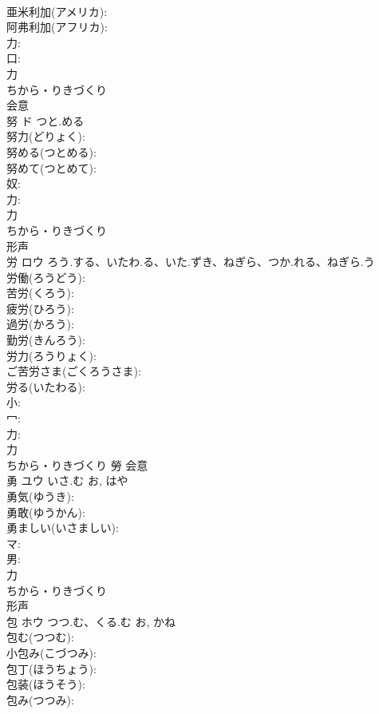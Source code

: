 \documentclass[8pt]{extreport}
\begin{document}
\begin{CJK}{UTF8}{min}
\\	亜米利加(アメリカ): 
\\	阿弗利加(アフリカ): 
\\	力: 
\\	口: 
\\	力	
\\	ちから・りきづくり	
\\	会意 
\\	努	ド	つと.める		
\\	努力(どりょく): 
\\	努める(つとめる): 
\\	努めて(つとめて): 
\\	奴: 
\\	力: 
\\	力	
\\	ちから・りきづくり	
\\	形声 
\\	労	ロウ	ろう.する、いたわ.る、いた.ずき、ねぎら、つか.れる、ねぎら.う		
\\	労働(ろうどう): 
\\	苦労(くろう): 
\\	疲労(ひろう): 
\\	過労(かろう): 
\\	勤労(きんろう): 
\\	労力(ろうりょく): 
\\	ご苦労さま(ごくろうさま): 
\\	労る(いたわる): 
\\	小: 
\\	冖: 
\\	力: 
\\	力	
\\	ちから・りきづくり	勞	会意 
\\	勇	ユウ	いさ.む	お, はや	
\\	勇気(ゆうき): 
\\	勇敢(ゆうかん): 
\\	勇ましい(いさましい): 
\\	マ: 
\\	男: 
\\	力	
\\	ちから・りきづくり	
\\	形声 
\\	包	ホウ	つつ.む、くる.む	お, かね	
\\	包む(つつむ): 
\\	小包み(こづつみ): 
\\	包丁(ほうちょう): 
\\	包装(ほうそう): 
\\	包み(つつみ): 

\end{CJK}
\end{document}
